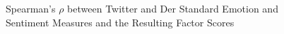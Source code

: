\documentclass[
  english,
  jou,floatsintext]{apa7}
\begin{document}
\begin{figure}[h!b]
\caption{Spearman's $\rho$ between Twitter and Der Standard Emotion and Sentiment Measures and the Resulting Factor Scores}\label{fig:spear-fa}
\end{figure}
\end{document}

